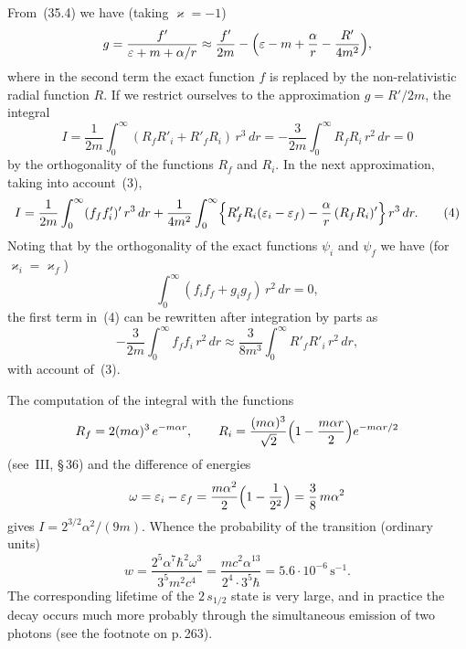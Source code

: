 From~(35.4) we have (taking $\varkappa = -1$)
\[
g = \frac{f'}{\varepsilon + m + \alpha/r} \approx \frac{f'}{2m} - \Bigl(\varepsilon - m + \frac{\alpha}{r} - \frac{R'}{4m^2}\Bigr),
\]
where in the second term the exact function $f$ is replaced by the non-relativistic radial function $R$. If we restrict ourselves to the approximation $g = R'/2m$, the integral
\begin{equation}
I = \frac{1}{2m}\int_0^\infty (R_f R'_i + R'_f R_i)\,r^3\,dr = -\frac{3}{2m}\int_0^\infty R_f R_i\,r^2\,dr = 0
\tag*{(3)}
\end{equation}
by the orthogonality of the functions $R_f$ and $R_i$. In the next approximation, taking into account~(3),
\begin{equation}
I = \frac{1}{2m}\int_0^\infty (f_f f'_i)'\,r^3\,dr + \frac{1}{4m^2}\int_0^\infty\Bigl\{R'_f R_i(\varepsilon_i - \varepsilon_f) - \frac{\alpha}{r}\,(R_f R_i)'\Bigr\}\,r^3\,dr.
\tag*{(4)}
\end{equation}
Noting that by the orthogonality of the exact functions $\psi_i$ and $\psi_f$ we have (for $\varkappa_i = \varkappa_f$)
\[
\int_0^\infty (f_i f_f + g_i g_f)\,r^2\,dr = 0,
\]
the first term in~(4) can be rewritten after integration by parts as
\[
-\frac{3}{2m}\int_0^\infty f_f f_i\,r^2\,dr \approx \frac{3}{8m^3}\int_0^\infty R'_f R'_i\,r^2\,dr,
\]
with account of~(3).

The computation of the integral with the functions
\[
R_f = 2(m\alpha)^3\,e^{-m\alpha r},\qquad R_i = \frac{(m\alpha)^3}{\sqrt{2}}\Bigl(1 - \frac{m\alpha r}{2}\Bigr)e^{-m\alpha r/2}
\]
(see~III, \S\,36) and the difference of energies
\[
\omega = \varepsilon_i - \varepsilon_f = \frac{m\alpha^2}{2}\Bigl(1 - \frac{1}{2^2}\Bigr) = \frac{3}{8}\,m\alpha^2
\]
gives $I = 2^{3/2}\alpha^2/(9m)$. Whence the probability of the transition (ordinary units)
\[
w = \frac{2^5\alpha^7\hbar^2\omega^3}{3^5m^2c^4} = \frac{mc^2\alpha^{13}}{2^4 \cdot 3^5\hbar} = 5.6 \cdot 10^{-6}\,\text{s}^{-1}.
\]
The corresponding lifetime of the $2\,s_{1/2}$ state is very large, and in practice the decay occurs much more probably through the simultaneous emission of two photons (see the footnote on p.\,263).
